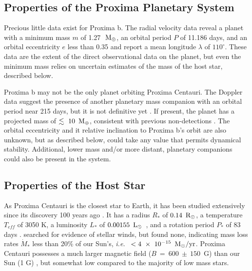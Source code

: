\documentclass[preprint,12pt]{aastex}
\def\mearth{{\rm\,M_\oplus}}
\def\msun{{\rm\,M_\odot}}
\def\rsun{{\rm\,R_\odot}}
\def\lsun{{\rm\,L_\odot}}
\def\ie{{\it i.e.\ }}
\begin{document}
\subsection{Properties of the Proxima Planetary System}

Precious little data exist for Proxima b. The radial velocity data
reveal a planet with a minimum mass $m$ of 1.27~$\mearth$, an orbital period $P$
of 11.186 days, and an orbital eccentricity $e$ less than 0.35 and
\cite{AngladaEscude16} report a mean longitude $\lambda$ of $110^\circ$. These
data are the extent of the direct observational data on the planet,
but even the minimum mass relies on uncertain estimates of the mass of
the host star, described below.

Proxima b may not be the only planet orbiting Proxima
Centauri. The Doppler data suggest the presence of another planetary
mass companion with an orbital period near 215 days, but it is not
definitive yet \citep{AngladaEscude16}. If present, the planet has a
projected mass of $\lesssim~10~\mearth$, consistent with previous
non-detections \citep{EndlKurster08,Barnes14,Lurie14}. The orbital
eccentricity and it relative inclination to Proxima b's orbit are also
unknown, but as described below, could take any value that permits
dynamical stability. Additional, lower mass and/or more distant,
planetary companions could also be present in the system.

\subsection{Properties of the Host Star}

As Proxima Centauri is the closest star to Earth, it has been studied
extensively since its discovery 100 years ago \citep{Innes1915}.  It
has a radius $R_*$ of $0.14~\rsun$, a temperature $T_{eff}$ of 3050 K, a
luminosity $L_*$ of $0.00155~\lsun$~\citep{Boyajian12}, and a rotation
period $P_*$ of 83 days \citep{Benedict98}. \cite{Wood01} searched for
evidence of stellar winds, but found none, indicating mass loss rates
$\dot{M}_*$ less than 20\% of our Sun's, \ie
$<4~\times~10^{-15}~\msun/\textrm{yr}$. Proxima Centauri possesses a
much larger magnetic field ($B~=~600~\pm~150$~G) than our Sun (1 G)
\citep{ReinersBasri08}, but somewhat low compared to the majority of
low mass stars.
\end{document}
